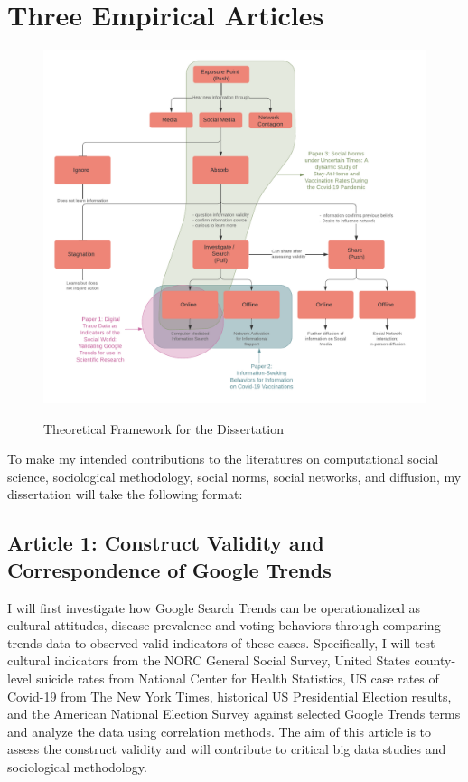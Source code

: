 \section{Three Empirical Articles}

\begin{figure}
{\centering \includegraphics[width=\linewidth]{figs/ch1/Dissertation Concept Map - Color.pdf}}
\caption{Theoretical Framework for the Dissertation}\label{fig:concept-map}
\end{figure}

To make my intended contributions to the literatures on computational
social science, sociological methodology, social norms, social networks,
and diffusion, my dissertation will take the following format:

\subsection{Article 1: Construct Validity and Correspondence of Google Trends}
I will first investigate how Google Search Trends can be operationalized
as cultural attitudes, disease prevalence and voting behaviors through
comparing trends data to observed valid indicators of these cases.
Specifically, I will test cultural indicators from the NORC General
Social Survey, United States county-level suicide rates from National
Center for Health Statistics, US case rates of Covid-19 from The New
York Times, historical US Presidential Election results, and the
American National Election Survey against selected Google Trends terms
and analyze the data using correlation methods. The aim of this article
is to assess the construct validity and will contribute to critical big
data studies and sociological methodology.

